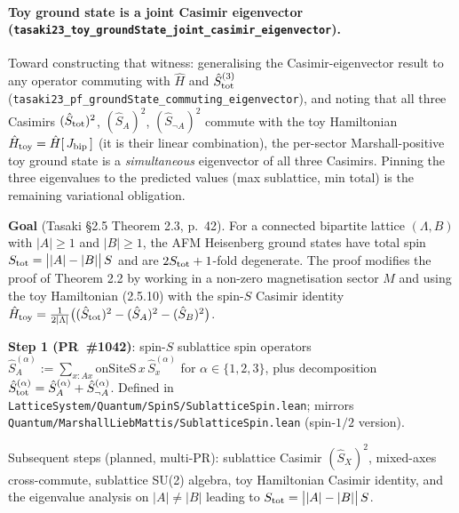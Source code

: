 \documentclass[a4paper,11pt]{article}
\begin{document}
\paragraph{Toy ground state is a joint Casimir eigenvector
(\texttt{tasaki23\_toy\_groundState\_joint\_casimir\_eigenvector}).} Toward
constructing that witness: generalising the Casimir-eigenvector result to any
operator commuting with $\hat H$ and $\hat S_{\rm tot}^{(3)}$
(\texttt{tasaki23\_pf\_groundState\_commuting\_eigenvector}), and noting that all
three Casimirs $(\hat S_{\rm tot})^2$, $(\hat S_A)^2$, $(\hat S_{\neg A})^2$
commute with the toy Hamiltonian $\hat H_{\rm toy}=\hat H[\,J_{\rm bip}\,]$ (it is
their linear combination), the per-sector Marshall-positive toy ground state is a
\emph{simultaneous} eigenvector of all three Casimirs. Pinning the three
eigenvalues to the predicted values (max sublattice, min total) is the remaining
variational obligation.

\textbf{Goal} (Tasaki §2.5 Theorem 2.3, p.~42). For a connected
bipartite lattice $(\Lambda, B)$ with $|A| \ge 1$ and $|B| \ge 1$,
the AFM Heisenberg ground states have total spin $S_{\rm tot} =
\bigl||A| - |B|\bigr|\,S$ and are $2 S_{\rm tot} + 1$-fold
degenerate. The proof modifies the proof of Theorem 2.2 by
working in a non-zero magnetisation sector $M$ and using the
toy Hamiltonian (2.5.10) with the spin-$S$ Casimir identity
$\hat H_{\rm toy} = \frac{1}{2|\Lambda|}\bigl((\hat S_{\rm tot})^2
- (\hat S_A)^2 - (\hat S_B)^2\bigr)$.

\textbf{Step 1 (PR~\#1042)}: spin-$S$ sublattice spin operators
$\hat S_A^{(\alpha)} := \sum_{x : A x} \mathrm{onSiteS}\,x\,
\hat S_x^{(\alpha)}$ for $\alpha \in \{1, 2, 3\}$, plus
decomposition $\hat S_{\rm tot}^{(\alpha)} = \hat S_A^{(\alpha)}
+ \hat S_{\neg A}^{(\alpha)}$. Defined in
\texttt{LatticeSystem/Quantum/SpinS/SublatticeSpin.lean};
mirrors \texttt{Quantum/MarshallLiebMattis/SublatticeSpin.lean}
(spin-$1/2$ version).

Subsequent steps (planned, multi-PR): sublattice Casimir
$(\hat S_X)^2$, mixed-axes cross-commute, sublattice SU(2)
algebra, toy Hamiltonian Casimir identity, and the eigenvalue
analysis on $|A| \neq |B|$ leading to $S_{\rm tot} =
\bigl||A| - |B|\bigr|\,S$.
\end{document}

